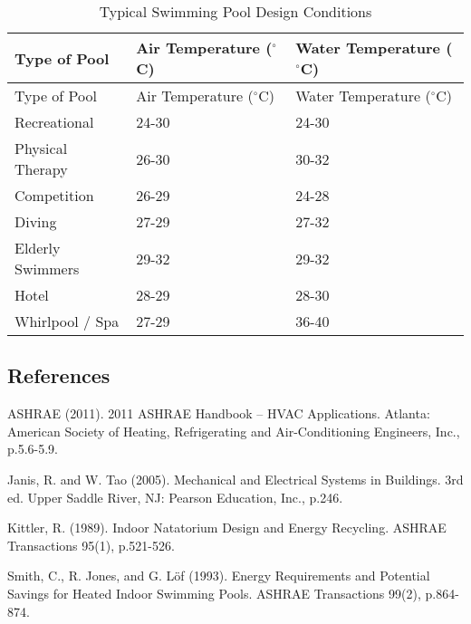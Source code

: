 \begin{longtable}[c]{@{}lll@{}}
\caption{Typical Swimming Pool Design Conditions \label{table:typical-swimming-pool-design-conditions}} \tabularnewline
\toprule 
Type of Pool & Air Temperature (\(^{\circ}\)C) & Water Temperature (\(^{\circ}\)C) \tabularnewline
\midrule
\endfirsthead

\toprule 
Type of Pool & Air Temperature (\(^{\circ}\)C) & Water Temperature (\(^{\circ}\)C) \tabularnewline
\midrule
\endhead

Recreational & 24-30 & 24-30 \tabularnewline
Physical Therapy & 26-30 & 30-32 \tabularnewline
Competition & 26-29 & 24-28 \tabularnewline
Diving & 27-29 & 27-32 \tabularnewline
Elderly Swimmers & 29-32 & 29-32 \tabularnewline
Hotel & 28-29 & 28-30 \tabularnewline
Whirlpool / Spa & 27-29 & 36-40 \tabularnewline
\bottomrule
\end{longtable}

\subsection{References}\label{references-030}

ASHRAE (2011). 2011 ASHRAE Handbook -- HVAC Applications. Atlanta: American Society of Heating, Refrigerating and Air-Conditioning Engineers, Inc., p.5.6-5.9.

Janis, R. and W. Tao (2005). Mechanical and Electrical Systems in Buildings. 3rd ed. Upper Saddle River, NJ: Pearson Education, Inc., p.246.

Kittler, R. (1989). Indoor Natatorium Design and Energy Recycling. ASHRAE Transactions 95(1), p.521-526.

Smith, C., R. Jones, and G. Löf (1993). Energy Requirements and Potential Savings for Heated Indoor Swimming Pools. ASHRAE Transactions 99(2), p.864-874.
